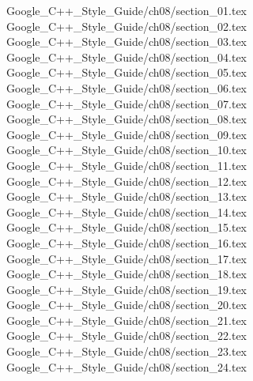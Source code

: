 {Google_C++_Style_Guide/ch08/section_01.tex}
{Google_C++_Style_Guide/ch08/section_02.tex}
{Google_C++_Style_Guide/ch08/section_03.tex}
{Google_C++_Style_Guide/ch08/section_04.tex}
{Google_C++_Style_Guide/ch08/section_05.tex}
{Google_C++_Style_Guide/ch08/section_06.tex}
{Google_C++_Style_Guide/ch08/section_07.tex}
{Google_C++_Style_Guide/ch08/section_08.tex}
{Google_C++_Style_Guide/ch08/section_09.tex}
{Google_C++_Style_Guide/ch08/section_10.tex}
{Google_C++_Style_Guide/ch08/section_11.tex}
{Google_C++_Style_Guide/ch08/section_12.tex}
{Google_C++_Style_Guide/ch08/section_13.tex}
{Google_C++_Style_Guide/ch08/section_14.tex}
{Google_C++_Style_Guide/ch08/section_15.tex}
{Google_C++_Style_Guide/ch08/section_16.tex}
{Google_C++_Style_Guide/ch08/section_17.tex}
{Google_C++_Style_Guide/ch08/section_18.tex}
{Google_C++_Style_Guide/ch08/section_19.tex}
{Google_C++_Style_Guide/ch08/section_20.tex}
{Google_C++_Style_Guide/ch08/section_21.tex}
{Google_C++_Style_Guide/ch08/section_22.tex}
{Google_C++_Style_Guide/ch08/section_23.tex}
{Google_C++_Style_Guide/ch08/section_24.tex}
